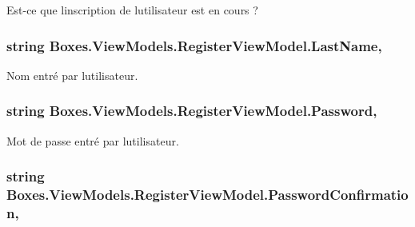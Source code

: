 Est-\/ce que l\textquotesingle{}inscription de l\textquotesingle{}utilisateur est en cours ? 

\subsubsection[{\texorpdfstring{Last\+Name}{LastName}}]{\setlength{\rightskip}{0pt plus 5cm}string Boxes.\+View\+Models.\+Register\+View\+Model.\+Last\+Name\hspace{0.3cm}{\ttfamily [get]}, {\ttfamily [set]}}\hypertarget{class_boxes_1_1_view_models_1_1_register_view_model_aa472c0e4d5e0b86954a8a9f8b6293c5f}{}\label{class_boxes_1_1_view_models_1_1_register_view_model_aa472c0e4d5e0b86954a8a9f8b6293c5f}


Nom entré par l\textquotesingle{}utilisateur. 

\subsubsection[{\texorpdfstring{Password}{Password}}]{\setlength{\rightskip}{0pt plus 5cm}string Boxes.\+View\+Models.\+Register\+View\+Model.\+Password\hspace{0.3cm}{\ttfamily [get]}, {\ttfamily [set]}}\hypertarget{class_boxes_1_1_view_models_1_1_register_view_model_a88e8df0efe69ebd8fa951b76a2c8018c}{}\label{class_boxes_1_1_view_models_1_1_register_view_model_a88e8df0efe69ebd8fa951b76a2c8018c}


Mot de passe entré par l\textquotesingle{}utilisateur. 

\subsubsection[{\texorpdfstring{Password\+Confirmation}{PasswordConfirmation}}]{\setlength{\rightskip}{0pt plus 5cm}string Boxes.\+View\+Models.\+Register\+View\+Model.\+Password\+Confirmation\hspace{0.3cm}{\ttfamily [get]}, {\ttfamily [set]}}\hypertarget{class_boxes_1_1_view_models_1_1_register_view_model_a858d39f447598841d607c8299ff1abb5}{}\label{class_boxes_1_1_view_models_1_1_register_view_model_a858d39f447598841d607c8299ff1abb5}


